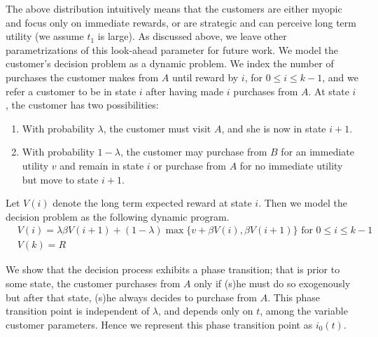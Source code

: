 The above distribution intuitively means that the customers are either myopic and focus only on immediate rewards, or are strategic and can perceive long term utility (we assume $t_1$ is large).
As discussed above, we leave other parametrizations of this look-ahead parameter for future work.
We model the customer's decision problem as a dynamic problem. We index the number of purchases the customer makes from $A$ until reward by $i$, for $0 \leq i \leq k-1$, and we refer a customer to be in state $i$ after having made $i$ purchases from $A$. At state $i$, the customer has two possibilities:
\begin{enumerate}
\item
With probability $\lambda$, the customer must visit $A$, and she is now in state $i+1$.
\item
With probability $1-\lambda$, the customer may purchase from $B$ for an immediate utility $v$ and remain in state $i$ or purchase from $A$ for no immediate utility but move to state $i+1$.
\end{enumerate}

Let $V(i)$ denote the long term expected reward at state $i$. Then we model the decision problem as the following dynamic program.
\begin{align*}
& V(i) = \lambda \beta V(i+1) + (1-\lambda)\max\{v+\beta V(i),\beta V(i+1) \} \mbox{ for } 0\leq i \leq k-1 \\
& V(k) = R
\end{align*}

We show that the decision process exhibits a phase transition; that is prior to some state, the customer purchases from $A$ only if (s)he must do so exogenously but after that state, (s)he always decides to purchase from $A$. 
This phase transition point is independent of $\lambda$, and depends only on $t$, among the variable customer parameters.
Hence we represent this phase transition point as $i_0(t)$.

